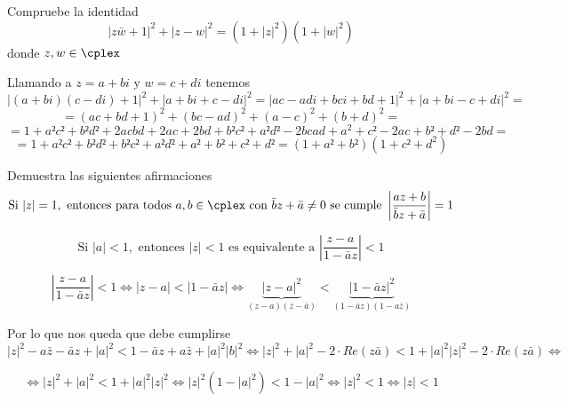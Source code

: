 \begin{problem}[4]
Compruebe la identidad
\[|z\bar{w}+1|^2+|z-w|^2 = (1+|z|^2)(1+|w|^2)\]
donde $z,w \in \cplex$

\solution

Llamando a $z=a+bi$ y $w=c+di$ tenemos
\[|(a+bi)(c-di)+1|^2+|a+bi+c-di|^2=|ac-adi+bci+bd+1|^2+|a+bi-c+di|^2 = \]
\[=(ac+bd+1)^2+(bc-ad)^2+(a-c)^2+(b+d)^2 =\]
\[= 1 + a²c²+b²d²+2acbd + 2ac+2bd+b²c²+a²d²-2bcad+a^2+c²-2ac+b²+d²-2bd =\]
\[= 1+a²c²+b²d²+b²c²+a²d²+a²+b²+c²+d² = (1+a²+b²)(1+c²+d^2)\]

\end{problem}

\begin{problem}[5]
Demuestra las siguientes afirmaciones
\ppart
\[\text{Si } |z|=1, \text{ entonces para todos } a,b \in \cplex \text{ con } \bar{b}z+\bar{a} \neq 0\text{ se cumple } \left| \frac{az+b}{\bar{b}z+\bar{a}}\right| = 1\]

\ppart
\[\text{Si } |a| < 1, \text{ entonces } |z| <1 \text{ es equivalente a } \left| \frac{z-a}{1-\bar{a}z}\right|<1\]

\solution

\spart


\spart

\[\left| \frac{z-a}{1-\bar{a}z}\right|<1 \iff |z-a| < |1-\bar{a}z| \iff \underbrace{|z-a|^2}_{(z-a)(\bar{z}-\bar{a})} < \underbrace{|1-\bar{a}z|^2}_{(1-\bar{a}z)(1-a\bar{z})} \]

Por lo que nos queda que debe cumplirse
\[|z|^2-a\bar{z}-\bar{a}z+|a|^2 < 1-\bar{a}z+a\bar{z}+|a|^2|b|^2 \iff |z|^2+|a|^2-2\cdot Re(z\bar{a}) < 1 + |a|^2|z|^2-2\cdot Re(z\bar{a}) \iff\]

\[\iff |z|^2 + |a|^2 < 1 +|a|^2|z|^2 \iff |z|^2(1-|a|^2) < 1 - |a|^2 \iff |z|^2 < 1 \iff |z| < 1\]

\end{problem}

